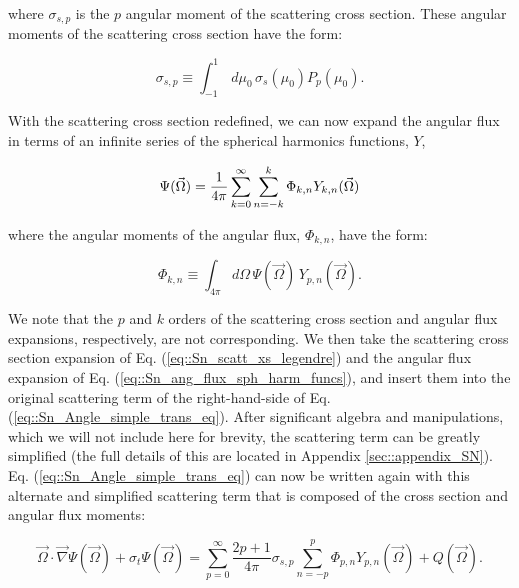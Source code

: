 \noindent where $\sigma_{s,p}$ is the $p$ angular moment of the scattering cross section. These angular moments of the scattering cross section have the form:

\begin{equation}
\label{eq::Sn_scatt_xs_moments}
	\sigma_{s,p} \equiv  \int_{-1}^{1} \, d \mu_0 \, \sigma_s ( \mu_0) P_p (\mu_0)  .
\end{equation}

With the scattering cross section redefined, we can now expand the angular flux in terms of an infinite series of the spherical harmonics functions, $Y$,

\begin{equation}
\label{eq::Sn_ang_flux_sph_harm_funcs}
\Psi (\vec{\Omega}) = \frac{1}{4 \pi} \sum\displaylimits_{k=0}^{\infty} \sum\displaylimits_{n=-k}^{k} \Phi_{k,n} Y_{k,n} (\vec{\Omega})
\end{equation}

\noindent where the angular moments of the angular flux, $\Phi_{k,n}$, have the form:

\begin{equation}
\label{eq::Sn_flux_moments}
	\Phi_{k,n} \equiv \int_{4 \pi} d\Omega \, \Psi(\vec{\Omega}) \, Y_{p,n} (\vec{\Omega}).
\end{equation}

\noindent We note that the $p$ and $k$ orders of the scattering cross section and angular flux expansions, respectively, are not corresponding. We then take the scattering cross section expansion of Eq. (\ref{eq::Sn_scatt_xs_legendre}) and the angular flux expansion of Eq. (\ref{eq::Sn_ang_flux_sph_harm_funcs}), and insert them into the original scattering term of the right-hand-side of Eq. (\ref{eq::Sn_Angle_simple_trans_eq}). After significant algebra and manipulations, which we will not include here for brevity, the scattering term can be greatly simplified (the full details of this are located in Appendix \ref{sec::appendix_SN}). Eq. (\ref{eq::Sn_Angle_simple_trans_eq}) can now be written again with this alternate and simplified scattering term that is composed of the cross section and angular flux moments:

\begin{equation}
\label{eq::Sn_Angle_simple_trans_eq_w_moments_inf}
\vec{\Omega} \cdot \vec{\nabla} \Psi (\vec{\Omega}) + \sigma_t \Psi (\vec{\Omega}) = \sum_{p=0}^{\infty} \frac{2p + 1}{4 \pi} \sigma_{s,p}   \sum_{n=-p}^{p}  \Phi_{p,n}  Y_{p,n} (  \vec{\Omega} )+ Q  (\vec{\Omega}) .
\end{equation}

